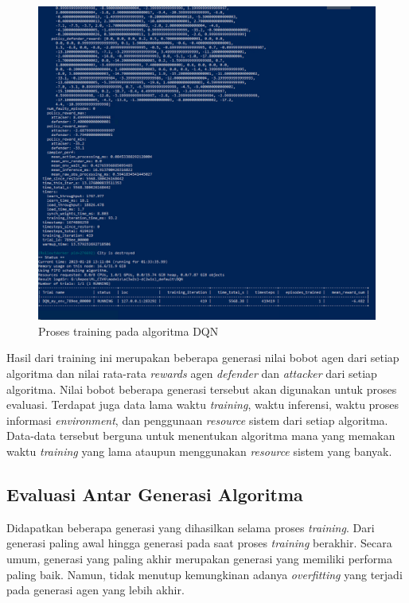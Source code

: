 \begin{figure}[H]
  \centering
    \includegraphics[scale=0.55]{gambar/training_process.png}
    \caption{Proses training pada algoritma DQN}
    \label{fig:trainingProcess}
\end{figure}

Hasil dari training ini merupakan beberapa generasi nilai bobot agen dari setiap algoritma dan nilai rata-rata \emph{rewards}
agen \emph{defender} dan \emph{attacker} dari setiap algoritma.
Nilai bobot beberapa generasi tersebut akan digunakan untuk proses evaluasi.
Terdapat juga data lama waktu \emph{training}, waktu inferensi, waktu proses informasi \emph{environment},
dan penggunaan \emph{resource} sistem dari setiap algoritma.
Data-data tersebut berguna untuk menentukan algoritma mana yang memakan waktu \emph{training} yang lama ataupun menggunakan \emph{resource} sistem yang banyak.

\subsection{Evaluasi Antar Generasi Algoritma}
Didapatkan beberapa generasi yang dihasilkan selama proses \emph{training}. 
Dari generasi paling awal hingga generasi pada saat proses \emph{training} berakhir.
Secara umum, generasi yang paling akhir merupakan generasi yang memiliki performa paling baik.
Namun, tidak menutup kemungkinan adanya \emph{overfitting} yang terjadi pada generasi agen yang lebih akhir.


